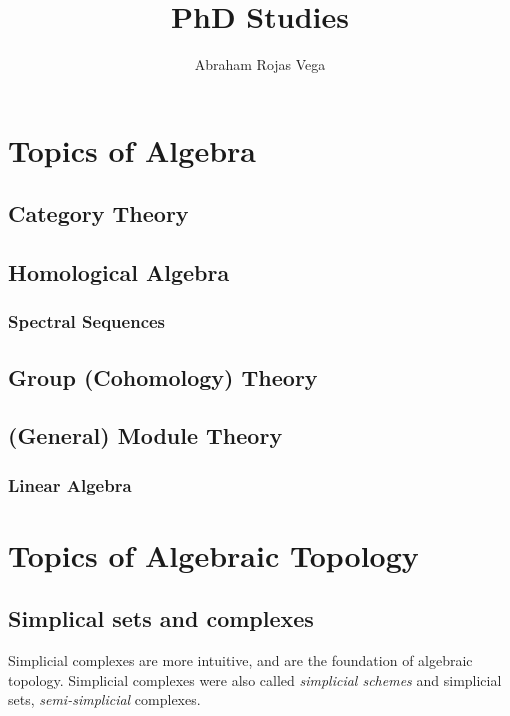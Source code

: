 \documentclass{book}
\title{PhD Studies}
\author{Abraham Rojas Vega}
\begin{document}
\maketitle

\tableofcontents
\part{Topics of Algebra}


\chapter{Category Theory}


\chapter{Homological Algebra}

\section{Spectral Sequences}




\chapter{Group (Cohomology) Theory} 





\chapter{(General) Module Theory}

\section{Linear Algebra}







\part{Topics of Algebraic Topology}



\chapter{Simplical sets and complexes}
\cite{weibelIntroductionHomologicalAlgebra1994}
Simplicial complexes are more intuitive, and are the foundation of algebraic topology. Simplicial complexes were also called \textit{simplicial schemes} and simplicial sets, \textit{semi-simplicial} complexes. 
\end{document}
